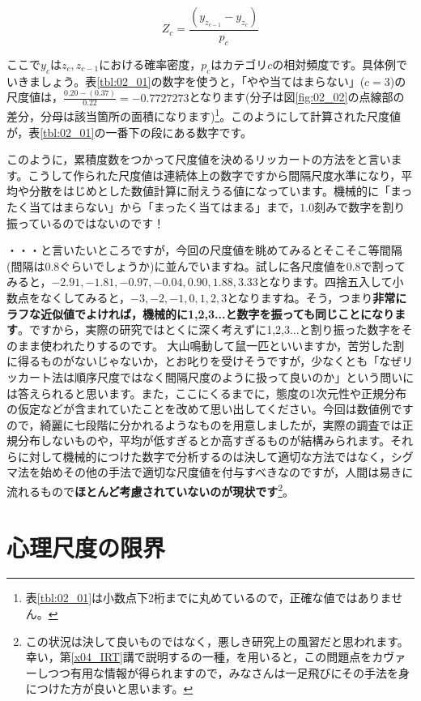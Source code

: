 \documentclass{ltjsbook}
\begin{document}
\[ Z_c = \frac{(y_{z_{c-1}} - y_{z_c})}{p_c} \]

ここで$y_c$は$z_c,z_{c-1}$における確率密度，$p_c$はカテゴリ$c$の相対頻度です。具体例でいきましょう。表\ref{tbl:02_01}の数字を使うと，「やや当てはまらない」($c=3$)の尺度値は，$\frac{0.20-(0.37)}{0.22}=-0.7727273$となります(分子は図\ref{fig:02_02}の点線部の差分，分母は該当箇所の面積になります)\footnote{表\ref{tbl:02_01}は小数点下2桁までに丸めているので，正確な値ではありません。}。このようにして計算された尺度値が，表\ref{tbl:02_01}の一番下の段にある数字です。

このように，累積度数をつかって尺度値を決めるリッカートの方法をと言います。こうして作られた尺度値は連続体上の数字ですから間隔尺度水準になり，平均や分散をはじめとした数値計算に耐えうる値になっています。機械的に「まったく当てはまらない」から「まったく当てはまる」まで，$1.0$刻みで数字を割り振っているのではないのです！


・・・と言いたいところですが，今回の尺度値を眺めてみるとそこそこ等間隔(間隔は$0.8$ぐらいでしょうか)に並んでいますね。試しに各尺度値を0.8で割ってみると，$-2.91,-1.81,-0.97, -0.04,0.90, 1.88, 3.33$となります。四捨五入して小数点をなくしてみると，$-3,-2,-1,0,1,2,3$となりますね。そう，つまり\textbf{非常にラフな近似値でよければ，機械的に1,2,3...と数字を振っても同じことになります}。ですから，実際の研究ではとくに深く考えずに1,2,3...と割り振った数字をそのまま使われたりするのです。
大山鳴動して鼠一匹といいますか，苦労した割に得るものがないじゃないか，とお叱りを受けそうですが，少なくとも「なぜリッカート法は順序尺度ではなく間隔尺度のように扱って良いのか」という問いには答えられると思います。また，ここにくるまでに，態度の1次元性や正規分布の仮定などが含まれていたことを改めて思い出してください。今回は数値例ですので，綺麗に七段階に分かれるようなものを用意しましたが，実際の調査では正規分布しないものや，平均が低すぎるとか高すぎるものが結構みられます。それらに対して機械的につけた数字で分析するのは決して適切な方法ではなく，シグマ法を始めその他の手法で適切な尺度値を付与すべきなのですが，人間は易きに流れるもので\textbf{ほとんど考慮されていないのが現状です}\footnote{この状況は決して良いものではなく，悪しき研究上の風習だと思われます。幸い，第\ref{x04_IRT}講で説明するの一種，を用いると，この問題点をカヴァーしつつ有用な情報が得られますので，みなさんは一足飛びにその手法を身につけた方が良いと思います。}。

\section{心理尺度の限界}
\end{document}
